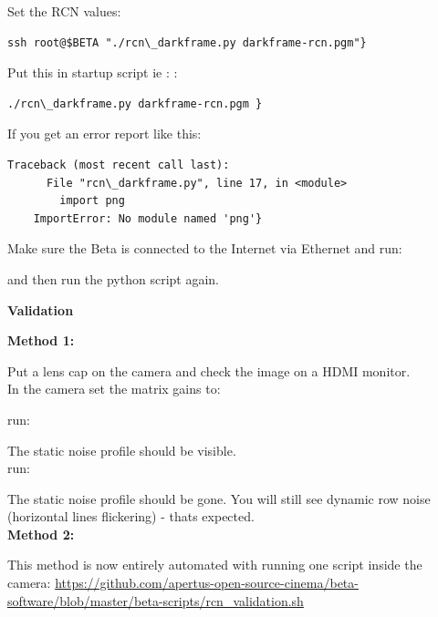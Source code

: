 {Set the RCN values: 

\begin{lstlisting}[breaklines=true, breakatwhitespace=true]
ssh root@$BETA "./rcn\_darkframe.py darkframe-rcn.pgm"}
\end{lstlisting} 

Put this in startup script ie :  :

\begin{lstlisting}[breaklines=true, breakatwhitespace=true]
./rcn\_darkframe.py darkframe-rcn.pgm }
\end{lstlisting} 

If you get an error report like this: 

\begin{lstlisting}[breaklines=true, breakatwhitespace=true]
    Traceback (most recent call last):
      File "rcn\_darkframe.py", line 17, in <module>
        import png
    ImportError: No module named 'png'}
\end{lstlisting} 

Make sure the Beta is connected to the Internet via Ethernet and run: 

 
and then run the python script again.

\textbf{Validation}

\textbf{Method 1:}

Put a lens cap on the camera and check the image on a HDMI monitor.\\

In the camera set the matrix gains to: 


run:


The static noise profile should be visible.\\

run: 


The static noise profile should be gone. You will still see dynamic row noise (horizontal lines flickering) - thats expected.\\


\textbf{Method 2:}

This method is now entirely automated with running one script inside the camera: \href{https://github.com/apertus-open-source-cinema/beta-software/blob/master/beta-scripts/rcn_validation.sh}{https://github.com/apertus-open-source-cinema/beta-software/blob/master/beta-scripts/rcn\_validation.sh}

}
